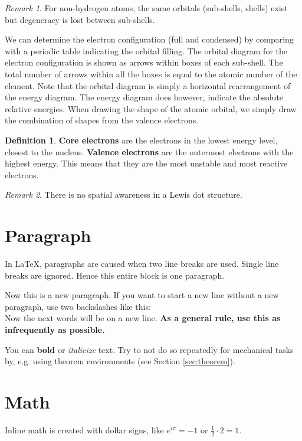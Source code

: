 \documentclass[11pt]{article}
\theoremstyle{plain} %
\theoremstyle{definition}
\newtheorem*{definition}{Definition} %
\theoremstyle{example}
\theoremstyle{remark}
\newtheorem*{remark}{Remark}
\newcommand{\half}{\frac{1}{2}}
\begin{document}
\begin{remark}
For non-hydrogen atoms, the same orbitals (sub-shells, shells) exist but degeneracy is lost between sub-shells. 
\end{remark}

We can determine the electron configuration (full and condensed) by comparing with a periodic table indicating the orbital filling. The orbital diagram for the electron configuration is shown as arrows within boxes of each sub-shell. The total number of arrows within all the boxes is equal to the atomic number of the element. Note that the orbital diagram is simply a horizontal rearrangement of the energy diagram. The energy diagram does however, indicate the absolute relative energies. When drawing the shape of the atomic orbital, we simply draw the combination of shapes from the valence electrons. 

\begin{definition}
\textbf{Core electrons} are the electrons in the lowest energy level, closest to the nucleus. \textbf{Valence electrons} are the outermost electrons with the highest energy. This means that they are the most unstable and most reactive electrons. 
\end{definition}




\begin{remark}
There is no spatial awareness in a Lewis dot structure. 
\end{remark}







\section{Paragraph}
In \LaTeX, paragraphs are caused
when two line breaks are used.
Single line breaks are ignored.
Hence this entire block is one paragraph.

Now this is a new paragraph. If you want to
start a new line without a new paragraph, use
two backslashes like this:
\\
Now the next words will be on a new line.
\textbf{As a general rule, use this as infrequently as possible.}

You can \textbf{bold} or \textit{italicize} text.
Try to not do so repeatedly for mechanical tasks by, e.g. using theorem environments (see Section \ref{sec:theorem}).


\section{Math}
Inline math is created with dollar signs,
like $e^{i \pi} = -1$ or $\half \cdot 2 = 1$.
\end{document}
